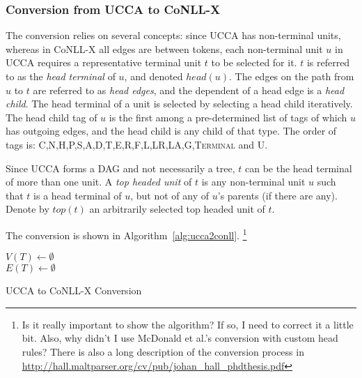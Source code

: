 \documentclass[11pt]{article}
\newcommand{\daniel}[1]{\footnote{\color{blue} #1}}
\begin{document}
\subsubsection{Conversion from UCCA to CoNLL-X}

The conversion relies on several concepts: since UCCA has non-terminal units, whereas in CoNLL-X all edges are between tokens, each non-terminal unit $u$ in UCCA requires a representative terminal unit $t$ to be selected for it. $t$ is referred to as the \textit{head terminal} of $u$, and denoted $head(u)$. The edges on the path from $u$ to $t$ are referred to as \textit{head edges}, and the dependent of a head edge is a \textit{head child}. The head terminal of a unit is selected by selecting a head child iteratively. The head child tag of $u$ is the first among a pre-determined list of tags of which $u$ has outgoing edges, and the head child is any child of that type. The order of tags is: \textsc{C,N,H,P,S,A,D,T,E,R,F,L,LR,LA,G,Terminal} and \textsc{U}.

Since UCCA forms a DAG and not necessarily a tree, $t$ can be the head terminal of more than one unit. A \textit{top headed unit} of $t$ is any non-terminal unit $u$ such that $t$ is a head terminal of $u$, but not of any of $u$'s parents (if there are any). Denote by $top(t)$ an arbitrarily selected top headed unit of $t$.

The conversion is shown in Algorithm~\ref{alg:ucca2conll}.
\daniel{Is it really important to show the algorithm? If so, I need to correct it a little bit. Also, why didn't I use McDonald et al.'s conversion with custom head rules? There is also a long description of the conversion process in \url{http://hall.maltparser.org/cv/pub/johan_hall_phdthesis.pdf}}

\begin{algorithm}
 $V(T) \leftarrow \emptyset$\\
 $E(T) \leftarrow \emptyset$\\
 \caption{UCCA to CoNLL-X Conversion}
 \label{alg:ucca2conll}
\end{algorithm}
\end{document}
